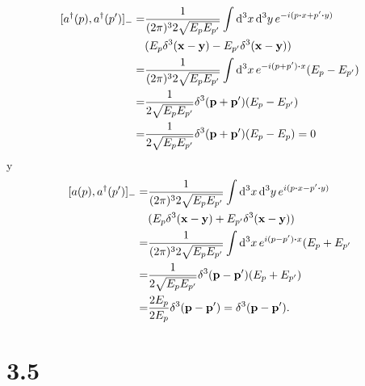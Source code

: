 \documentclass{article}
\begin{document}
\begin{align}
\begin{split}
[a^\dagger(p),a^\dagger(p')]_-=&\frac{1}{(2\pi)^32\sqrt{E_pE_{p'}}}\int \dd[3]{x}\dd[3]{y}e^{-i(p\vdot x+p'\vdot y)}\\
&(E_p\delta^3(\vb{x}-\vb{y})-E_{p'}\delta^3(\vb{x}-\vb{y}))\\
=&\frac{1}{(2\pi)^32\sqrt{E_pE_{p'}}}\int \dd[3]{x}e^{-i(p+p')\vdot x}(E_{p}-E_{p'})\\
=&\frac{1}{2\sqrt{E_pE_{p'}}}\delta^3(\vb{p}+\vb{p'})(E_{p}-E_{p'})\\
=&\frac{1}{2\sqrt{E_pE_{p'}}}\delta^3(\vb{p}+\vb{p'})(E_p-E_p)=0
\end{split}
\end{align}
y
\begin{align}
\begin{split}
[a(p),a^\dagger(p')]_-=&\frac{1}{(2\pi)^32\sqrt{E_pE_{p'}}}\int \dd[3]{x}\dd[3]{y}e^{i(p\vdot x-p'\vdot y)}\\
&(E_p\delta^3(\vb{x}-\vb{y})+E_{p'}\delta^3(\vb{x}-\vb{y}))\\
=&\frac{1}{(2\pi)^32\sqrt{E_pE_{p'}}}\int \dd[3]{x}e^{i(p-p')\vdot x}(E_{p}+E_{p'}\\
=&\frac{1}{2\sqrt{E_pE_{p'}}}\delta^3(\vb{p}-\vb{p'})(E_{p}+E_{p'})\\
=&\frac{2E_p}{2E_p}\delta^3(\vb{p}-\vb{p'})=\delta^3(\vb{p}-\vb{p'}).
\end{split}
\end{align}

\section*{3.5}
\end{document}
